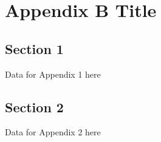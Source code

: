 \chapter{Appendix B Title}
\label{chp:appB}

\section{Section 1}
Data for Appendix 1 here

\section{Section 2}
Data for Appendix 2 here
